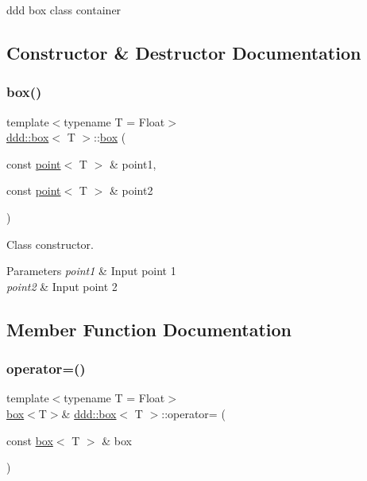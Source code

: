 ddd box class container 

\subsection{Constructor \& Destructor Documentation}
\mbox{\label{classddd_1_1box_afb3bf0799aac08e5b58dbb955be99a78}} 
\subsubsection{\texorpdfstring{box()}{box()}}
{\footnotesize\ttfamily template$<$typename T = Float$>$ \\
\hyperlink{classddd_1_1box}{ddd\+::box}$<$ T $>$\+::\hyperlink{classddd_1_1box}{box} (\begin{DoxyParamCaption}\item[{const \hyperlink{classddd_1_1point}{point}$<$ T $>$ \&}]{point1,  }\item[{const \hyperlink{classddd_1_1point}{point}$<$ T $>$ \&}]{point2 }\end{DoxyParamCaption})\hspace{0.3cm}{\ttfamily [inline]}}



Class constructor. 


\begin{DoxyParams}{Parameters}
{\em point1} & Input point 1 \\
\hline
{\em point2} & Input point 2 \\
\hline
\end{DoxyParams}


\subsection{Member Function Documentation}
\mbox{\label{classddd_1_1box_a80ec0210ef2e3bcb0cd8e22e77f5c89d}} 
\subsubsection{\texorpdfstring{operator=()}{operator=()}}
{\footnotesize\ttfamily template$<$typename T = Float$>$ \\
\hyperlink{classddd_1_1box}{box}$<$T$>$\& \hyperlink{classddd_1_1box}{ddd\+::box}$<$ T $>$\+::operator= (\begin{DoxyParamCaption}\item[{const \hyperlink{classddd_1_1box}{box}$<$ T $>$ \&}]{box }\end{DoxyParamCaption})\hspace{0.3cm}{\ttfamily [inline]}}



